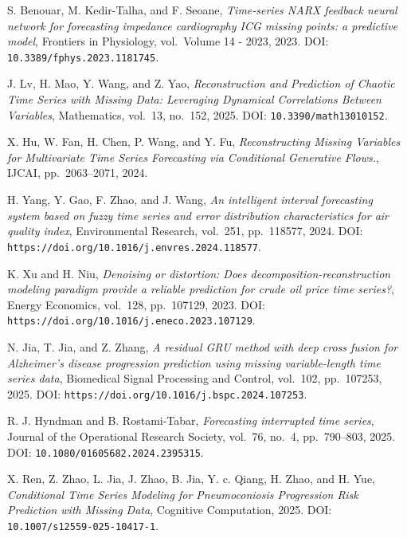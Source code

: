 \begin{enumerate}[label={[S\arabic*]}]
    \item %
    S. Benouar, M. Kedir-Talha, and F. Seoane, \textit{Time-series NARX feedback neural network for forecasting impedance cardiography ICG missing points: a predictive model}, Frontiers in Physiology, vol.~Volume 14 - 2023, 2023. DOI: \texttt{10.3389/fphys.2023.1181745}.
    \item %
    J. Lv, H. Mao, Y. Wang, and Z. Yao, \textit{Reconstruction and Prediction of Chaotic Time Series with Missing Data: Leveraging Dynamical Correlations Between Variables}, Mathematics, vol.~13, no.~152, 2025. DOI: \texttt{10.3390/math13010152}.
    \item %
    X. Hu, W. Fan, H. Chen, P. Wang, and Y. Fu, \textit{Reconstructing Missing Variables for Multivariate Time Series Forecasting via Conditional Generative Flows.}, IJCAI, pp.~2063–2071, 2024.
    \item %
    H. Yang, Y. Gao, F. Zhao, and J. Wang, \textit{An intelligent interval forecasting system based on fuzzy time series and error distribution characteristics for air quality index}, Environmental Research, vol.~251, pp.~118577, 2024. DOI: \texttt{https://doi.org/10.1016/j.envres.2024.118577}.
    \item %
    K. Xu and H. Niu, \textit{Denoising or distortion: Does decomposition-reconstruction modeling paradigm provide a reliable prediction for crude oil price time series?}, Energy Economics, vol.~128, pp.~107129, 2023. DOI: \texttt{https://doi.org/10.1016/j.eneco.2023.107129}.
    \item %
    N. Jia, T. Jia, and Z. Zhang, \textit{A residual GRU method with deep cross fusion for Alzheimer’s disease progression prediction using missing variable-length time series data}, Biomedical Signal Processing and Control, vol.~102, pp.~107253, 2025. DOI: \texttt{https://doi.org/10.1016/j.bspc.2024.107253}.
    \item %
    R. J. Hyndman and B. Rostami-Tabar, \textit{Forecasting interrupted time series}, Journal of the Operational Research Society, vol.~76, no.~4, pp.~790–803, 2025. DOI: \texttt{10.1080/01605682.2024.2395315}.
    \item %
    X. Ren, Z. Zhao, L. Jia, J. Zhao, B. Jia, Y. c. Qiang, H. Zhao, and H. Yue, \textit{Conditional Time Series Modeling for Pneumoconiosis Progression Risk Prediction with Missing Data}, Cognitive Computation, 2025. DOI: \texttt{10.1007/s12559-025-10417-1}.
    \item %

\end{enumerate}
